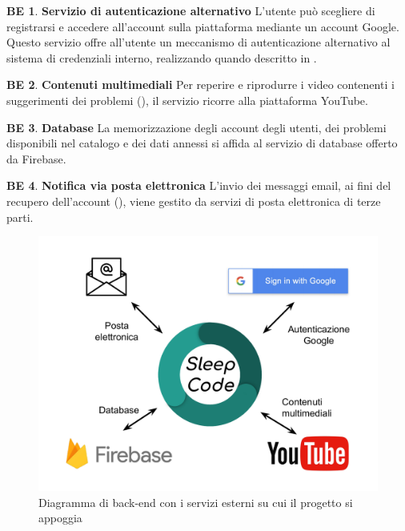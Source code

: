 \documentclass[11pt, a4paper]{article}
\theoremstyle{definition}
\newtheorem{backend}{BE}
\begin{document}
\begin{backend}
\textbf{Servizio di autenticazione alternativo }
L'utente può scegliere di registrarsi e accedere all'account sulla piattaforma
mediante un account Google. Questo servizio offre all'utente un meccanismo di
autenticazione alternativo al sistema di credenziali interno, realizzando quando
descritto in \textcolor{blue}{}.
\end{backend}

\begin{backend}
\textbf{Contenuti multimediali }
Per reperire e riprodurre i video contenenti i suggerimenti dei problemi (\textcolor{blue}{}),
il servizio ricorre alla piattaforma YouTube.
\end{backend}

\begin{backend}
\textbf{Database }
La memorizzazione degli account degli utenti, dei problemi disponibili
nel catalogo e dei dati annessi si affida al servizio di database offerto
da Firebase.
\end{backend}

\begin{backend}
\textbf{Notifica via posta elettronica }
L'invio dei messaggi email, ai fini del recupero dell'account (\textcolor{blue}{}),
viene gestito da servizi di posta elettronica di terze parti.
\end{backend}

\begin{figure}[H]
\centering
\includegraphics[scale=0.45]{materiale/backend.pdf}
\caption{Diagramma di back-end con i servizi esterni su cui il progetto si appoggia}
\label{backend}
\end{figure}
\end{document}
